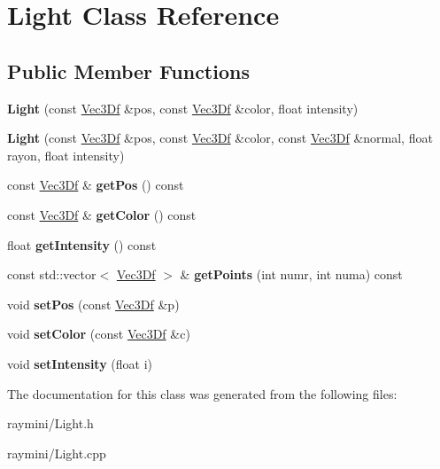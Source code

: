 \hypertarget{class_light}{
\section{Light Class Reference}
\label{class_light}
}
\subsection*{Public Member Functions}
\begin{DoxyCompactItemize}
\item 
\hypertarget{class_light_a5a9290bfca6e7f8909a18735dcc9da37}{
{\bfseries Light} (const \hyperlink{class_vec3_d}{Vec3Df} \&pos, const \hyperlink{class_vec3_d}{Vec3Df} \&color, float intensity)}
\label{class_light_a5a9290bfca6e7f8909a18735dcc9da37}

\item 
\hypertarget{class_light_a49fdd4c7b101ffb77c1595e7d5ff7ca2}{
{\bfseries Light} (const \hyperlink{class_vec3_d}{Vec3Df} \&pos, const \hyperlink{class_vec3_d}{Vec3Df} \&color, const \hyperlink{class_vec3_d}{Vec3Df} \&normal, float rayon, float intensity)}
\label{class_light_a49fdd4c7b101ffb77c1595e7d5ff7ca2}

\item 
\hypertarget{class_light_a4df5adb9ce0b7766af839bda72d86d84}{
const \hyperlink{class_vec3_d}{Vec3Df} \& {\bfseries getPos} () const }
\label{class_light_a4df5adb9ce0b7766af839bda72d86d84}

\item 
\hypertarget{class_light_aa2c88eb97bbda607b4ecf0b718f57d5a}{
const \hyperlink{class_vec3_d}{Vec3Df} \& {\bfseries getColor} () const }
\label{class_light_aa2c88eb97bbda607b4ecf0b718f57d5a}

\item 
\hypertarget{class_light_ab0d1f1347856b81a7a4dba0a6833cc3c}{
float {\bfseries getIntensity} () const }
\label{class_light_ab0d1f1347856b81a7a4dba0a6833cc3c}

\item 
\hypertarget{class_light_ab24ff1fac909904ffd93cef1f3991637}{
const std::vector$<$ \hyperlink{class_vec3_d}{Vec3Df} $>$ \& {\bfseries getPoints} (int numr, int numa) const }
\label{class_light_ab24ff1fac909904ffd93cef1f3991637}

\item 
\hypertarget{class_light_a148f99cba1ccf7a13dbe65273a090710}{
void {\bfseries setPos} (const \hyperlink{class_vec3_d}{Vec3Df} \&p)}
\label{class_light_a148f99cba1ccf7a13dbe65273a090710}

\item 
\hypertarget{class_light_ac4d6006127c6b7a36a6533650b2e5f38}{
void {\bfseries setColor} (const \hyperlink{class_vec3_d}{Vec3Df} \&c)}
\label{class_light_ac4d6006127c6b7a36a6533650b2e5f38}

\item 
\hypertarget{class_light_a5ab256c92798821097c687d8bfc95a40}{
void {\bfseries setIntensity} (float i)}
\label{class_light_a5ab256c92798821097c687d8bfc95a40}

\end{DoxyCompactItemize}


The documentation for this class was generated from the following files:\begin{DoxyCompactItemize}
\item 
raymini/Light.h\item 
raymini/Light.cpp\end{DoxyCompactItemize}

